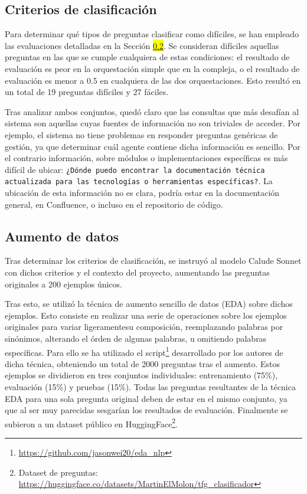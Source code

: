 \subsection{Criterios de clasificación}
Para determinar qué tipos de preguntas clasificar como difíciles, se han empleado las evaluaciones detalladas en la Sección \colorbox{yellow}{\ref{}}. Se consideran difíciles aquellas preguntas en las que se cumple cualquiera de estas condiciones: el resultado de evaluación es peor en la orquestación simple que en la compleja, o el resultado de evaluación es menor a 0.5 en cualquiera de las dos orquestaciones. Esto resultó en un total de 19 preguntas difíciles y 27 fáciles. 

Tras analizar ambos conjuntos, quedó claro que las consultas que más desafían al sistema son aquellas cuyas fuentes de información no son triviales de acceder. Por ejemplo, el sistema no tiene problemas en responder preguntas genéricas de gestión, ya que determinar cuál agente contiene dicha información es sencillo. Por el contrario información, sobre módulos o implementaciones específicas es más difícil de ubicar: \texttt{¿Dónde puedo encontrar la documentación técnica actualizada para las tecnologías o herramientas específicas?}. La ubicación de esta información no es clara, podría estar en la documentación general, en Confluence, o incluso en el repositorio de código. 

\subsection{Aumento de datos}
Tras determinar los criterios de clasificación, se instruyó al modelo Calude Sonnet con dichos criterios y el contexto del proyecto, aumentando las preguntas originales a 200 ejemplos únicos.

Tras esto, se utilizó la técnica de aumento sencillo de datos (EDA) \cite{} sobre dichos ejemplos. Esto consiste en realizar una serie de operaciones sobre los ejemplos originales para variar ligeramentesu composición, reemplazando palabras por sinónimos, alterando el órden de algunas palabras, u omitiendo palabras específicas. Para ello se ha utilizado el script\footnote{\url{https://github.com/jasonwei20/eda_nlp}} desarrollado por los autores de dicha técnica, obteniendo un total de 2000 preguntas tras el aumento.   
Estos ejemplos se dividieron en tres conjuntos individuales: entrenamiento (75\%), evaluación (15\%) y pruebas (15\%). Todas las preguntas resultantes de la técnica EDA para una sola pregunta original deben de estar en el mismo conjunto, ya que al ser muy parecidas sesgarían los resultados de evaluación. Finalmente se subieron a un dataset público en HuggingFace\footnote{Dataset de preguntas: \url{https://huggingface.co/datasets/MartinElMolon/tfg_clasificador}}. 

